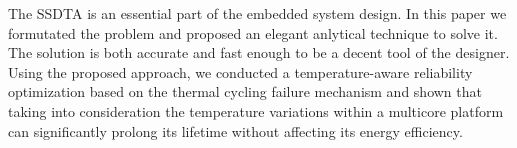 The SSDTA is an essential part of the embedded system design. In this paper we formutated the problem and proposed an elegant anlytical technique to solve it. The solution is both accurate and fast enough to be a decent tool of the designer. Using the proposed approach, we conducted a temperature-aware reliability optimization based on the thermal cycling failure mechanism and shown that taking into consideration the temperature variations within a multicore platform can significantly prolong its lifetime without affecting its energy efficiency.
